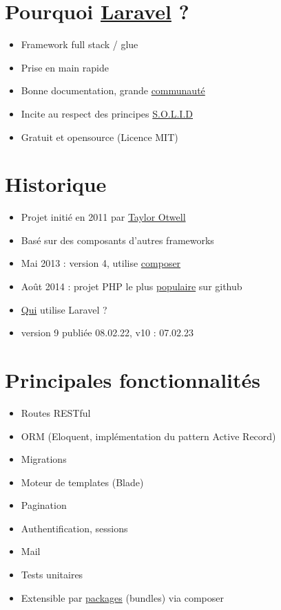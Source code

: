 \hypertarget{pourquoi-laravel}{%
\section{\texorpdfstring{Pourquoi \href{https://laravel.com/}{Laravel}
?}{Pourquoi Laravel ?}}\label{pourquoi-laravel}}

\begin{itemize}
\tightlist
\item
  Framework full stack / glue
\item
  Prise en main rapide
\item
  Bonne documentation, grande \href{http://laravel.io/forum}{communauté}
\item
  Incite au respect des principes
  \href{http://fr.wikipedia.org/wiki/SOLID_(informatique)}{S.O.L.I.D}
\item
  Gratuit et opensource (Licence MIT)
\end{itemize}

\hypertarget{historique}{%
\section{Historique}\label{historique}}

\begin{itemize}
\tightlist
\item
  Projet initié en 2011 par \href{http://taylorotwell.com/}{Taylor
  Otwell}
\item
  Basé sur des composants d'autres frameworks
\item
  Mai 2013 : version 4, utilise
  \href{https://getcomposer.org/}{composer}
\item
  Août 2014 : projet PHP le plus
  \href{https://github.com/search?l=PHP\&q=stars\%3A\%3E0\&ref=searchresults\&type=Repositories}{populaire}
  sur github
\item
  \href{https://madewithlaravel.com/}{Qui} utilise Laravel ?
\item
  version 9 publiée 08.02.22, v10 : 07.02.23
\end{itemize}

\hypertarget{principales-fonctionnalituxe9s}{%
\section{Principales
fonctionnalités}\label{principales-fonctionnalituxe9s}}

\begin{itemize}
\tightlist
\item
  Routes RESTful
\item
  ORM (Eloquent, implémentation du pattern Active Record)
\item
  Migrations
\item
  Moteur de templates (Blade)
\item
  Pagination
\item
  Authentification, sessions
\item
  Mail
\item
  Tests unitaires
\item
  Extensible par \href{http://packalyst.com/}{packages} (bundles) via
  composer
\end{itemize}

